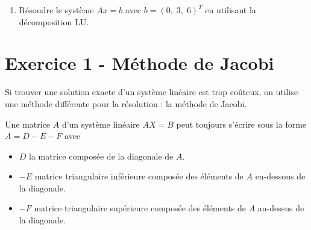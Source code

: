 \begin{enumerate}
    \item Résoudre le système $Ax = b$ avec $b = (0,\;3,\;6)^T$ en utilisant la décomposition LU.

\end{enumerate}

\vspace{2em}


\section*{Exercice 1 - Méthode de Jacobi}
Si trouver une solution exacte d'un système linéaire est trop coûteux, on utilise une méthode différente pour la résolution : la méthode de Jacobi.

Une matrice $A$ d'un système linéaire $A X=B$ peut toujours s'écrire sous la forme $A=D-E-F$ avec
\begin{itemize}
    \item[$\bullet$] $D$ la matrice composée de la diagonale de $A$.
    \item[$\bullet$] $-E$ matrice triangulaire inférieure composée des éléments de $A$ en-dessous de la diagonale.
    \item[$\bullet$] $-F$ matrice triangulaire supérieure composée des éléments de $A$ au-dessus de la diagonale.
\end{itemize}

